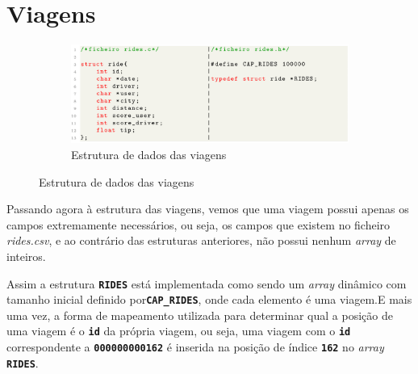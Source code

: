 \documentclass[12pt,a4paper]{report}
\begin{document}
\section{Viagens}

\begin{figure}[hbt!]
    \centering
    \begin{subfigure}{\textwidth}
        \centering
        \includegraphics[width=1\linewidth]{images/rides.png}
        \caption*{Estrutura de dados das viagens}
        \label{fig:rides}
    \end{subfigure}
\end{figure}

Passando agora à estrutura das viagens, vemos que uma viagem possui apenas os campos extremamente necessários, ou seja, os campos que existem no ficheiro \textit{rides.csv}, e ao contrário das estruturas anteriores, não possui nenhum \textit{array} de inteiros.

Assim a estrutura \textbf{\small\texttt{RIDES}} está implementada como sendo um \textit{array} dinâmico com tamanho inicial definido por\textbf{\small\texttt{CAP\_RIDES}}, onde cada elemento é uma viagem.E mais uma vez, a forma de mapeamento utilizada para determinar qual a posição de uma viagem é o \textbf{\small\texttt{id}} da própria viagem, ou seja, uma viagem com o \textbf{\small\texttt{id}} correspondente a \textbf{\small\texttt{000000000162}} é inserida na posição de índice \textbf{\small\texttt{162}} no \textit{array} \textbf{\small\texttt{RIDES}}.

\pagebreak
\end{document}
